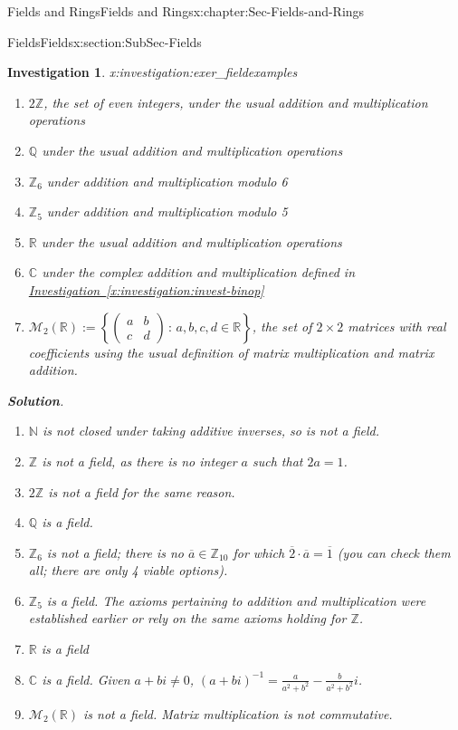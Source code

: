 \documentclass[oneside,10pt,]{book}
\newcommand{\blocktitlefont}{\relax}
\newcommand{\xreffont}{\relax}
\numberwithin{equation}{section}
\newcommand{\setof}[2]{{\left\{#1\,\colon\,#2\right\}}}
\def\C{{\mathbb C}}
\def\Z{{\mathbb Z}}
\def\Q{{\mathbb Q}}
\def\N{{\mathbb N}}
\def\R{{\mathbb R}}
\newtheorem{investigation}[theorem]{Investigation}
\newcommand{\amp}{&}
\begin{document}
\begin{chapterptx}{Fields and Rings}{}{Fields and Rings}{}{}{x:chapter:Sec-Fields-and-Rings}
\begin{sectionptx}{Fields}{}{Fields}{}{}{x:section:SubSec-Fields}
\begin{investigation}{}{x:investigation:exer_fieldexamples}
\begin{enumerate}
\item{}\(2\Z\), the set of even integers, under the usual addition and multiplication operations%
\item{}\(\Q\) under the usual addition and multiplication operations%
\item{}\(\Z_{6}\) under addition and multiplication modulo 6%
\item{}\(\Z_{5}\) under addition and multiplication modulo 5%
\item{}\(\R\) under the usual addition and multiplication operations%
\item{}\(\C\) under the complex addition and multiplication defined in \hyperref[x:investigation:invest-binop]{Investigation~{\xreffont\ref{x:investigation:invest-binop}}}%
\item{}\(\mathcal{M}_2(\R) := \setof{\left(\begin{matrix}a \amp b \\ c \amp d \end{matrix} \right)}{a,b,c,d\in\R}\)\footnotemark{}, the set of \(2\times 2\) matrices with real coefficients using the usual definition of matrix multiplication\footnotemark{} and matrix addition.%
\end{enumerate}
%
\par\smallskip%
\noindent\textbf{\blocktitlefont Solution}.\hypertarget{g:solution:idp105544811930768}{}\quad{}%
\begin{enumerate}
\item{}\(\N\) is not closed under taking additive inverses, so is not a field.%
\item{}\(\Z\) is not a field, as there is no integer \(a\) such that \(2a = 1\).%
\item{}\(2\Z\) is not a field for the same reason.%
\item{}\(\Q\) is a field.%
\item{}\(\Z_{6}\) is not a field; there is no \(\overline{a}\in \Z_{10}\) for which \(\overline{2}\cdot \overline{a} = \overline{1}\) (you can check them all; there are only 4 viable options).%
\item{}\(\Z_{5}\) \emph{is} a field. The axioms pertaining to addition and multiplication were established earlier or rely on the same axioms holding for \(\Z\).%
\item{}\(\R\) is a field%
\item{}\(\C\) is a field. Given \(a+bi\ne 0\), \((a+bi)^{-1} = \frac{a}{a^2 + b^2} - \frac{b}{a^2 + b^2} i\).%
\item{}\(\mathcal{M}_2(\R)\) is not a field. Matrix multiplication is not commutative.%

\end{enumerate}
\end{investigation}
\end{sectionptx}
\end{chapterptx}
\end{document}

